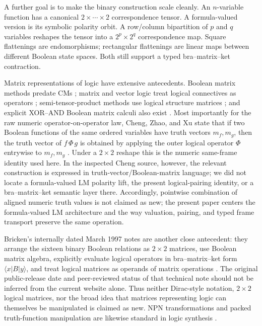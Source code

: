 \documentclass[11pt]{article}
\theoremstyle{definition}
\theoremstyle{remark}
\begin{document}
A further goal is to make the binary construction scale cleanly.  An $n$-variable function has a canonical $2\times\cdots\times2$ correspondence tensor.  A formula-valued version is its symbolic polarity orbit.  A row/column bipartition of $p$ and $q$ variables reshapes the tensor into a $2^p\times2^q$ correspondence map.  Square flattenings are endomorphisms; rectangular flattenings are linear maps between different Boolean state spaces.  Both still support a typed bra--matrix--ket contraction.

Matrix representations of logic have extensive antecedents.  Boolean matrix methods predate CMs \cite{Edwards1972}; matrix and vector logic treat logical connectives as operators \cite{Stern1988,Mizraji1992,Mizraji2008}; semi-tensor-product methods use logical structure matrices \cite{ChengQi2010,ZhaoSTP}; and explicit XOR--AND Boolean matrix calculi also exist \cite{Cheng2011}.  Most importantly for the raw numeric operator-on-operator law, Cheng, Zhao, and Xu state that if two Boolean functions of the same ordered variables have truth vectors $m_f,m_g$, then the truth vector of $f\,\Phi\,g$ is obtained by applying the outer logical operator $\Phi$ entrywise to $m_f,m_g$ \cite[Prop.~3.3]{Cheng2011}.  Under a $2\times2$ reshape this is the numeric same-frame identity used here.  In the inspected Cheng source, however, the relevant construction is expressed in truth-vector/Boolean-matrix language; we did not locate a formula-valued LM polarity lift, the present logical-pairing identity, or a bra--matrix--ket semantic layer there.  Accordingly, pointwise combination of aligned numeric truth values is not claimed as new; the present paper centers the formula-valued LM architecture and the way valuation, pairing, and typed frame transport preserve the same operation.

Bricken's internally dated March 1997 notes are another close antecedent: they arrange the sixteen binary Boolean relations as $2\times2$ matrices, use Boolean matrix algebra, explicitly evaluate logical operators in bra--matrix--ket form $\langle x|B|y\rangle$, and treat logical matrices as operands of matrix operations \cite{Bricken1997}.  The original public-release date and peer-reviewed status of that technical note should not be inferred from the current website alone.  Thus neither Dirac-style notation, $2\times2$ logical matrices, nor the broad idea that matrices representing logic can themselves be manipulated is claimed as new.  NPN transformations and packed truth-function manipulation are likewise standard in logic synthesis \cite{Mishchenko2006,Zhou2019}.
\end{document}
